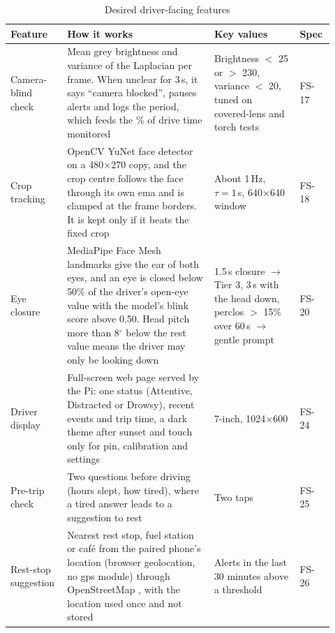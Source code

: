 \begin{table}[htbp]
\centering
\caption{Desired driver-facing features}
\label{tab:ch4-desired}
\footnotesize
\setlength{\tabcolsep}{3pt}
\renewcommand{\arraystretch}{1.15}
\begin{tabular}{|p{0.150\linewidth}|p{0.430\linewidth}|p{0.250\linewidth}|p{0.090\linewidth}|}
\hline
\textbf{Feature} & \textbf{How it works} & \textbf{Key values} & \textbf{Spec} \\
\hline
Camera-blind check & Mean grey brightness and variance of the Laplacian \cite{r74} per frame. When unclear for 3\,s, it says ``camera blocked'', pauses alerts and logs the period, which feeds the \% of drive time monitored & Brightness $<$ 25 or $>$ 230, variance $<$ 20, tuned on covered-lens and torch tests & FS-17 \\
\hline
Crop tracking & OpenCV YuNet face detector on a 480$\times$270 copy, and the crop centre follows the face through its own \gls{ema} and is clamped at the frame borders. It is kept only if it beats the fixed crop & About 1\,Hz, $\tau = 1$\,s, 640$\times$640 window & FS-18 \\
\hline
Eye closure & MediaPipe Face Mesh \cite{r49} landmarks give the \gls{ear} of both eyes, and an eye is closed below 50\% of the driver's open-eye value with the model's blink score above 0.50. Head pitch more than 8$^\circ$ below the rest value means the driver may only be looking down & 1.5\,s closure $\rightarrow$ Tier 3, 3\,s with the head down, \gls{perclos} $>$ 15\% over 60\,s $\rightarrow$ gentle prompt & FS-20 \\
\hline
Driver display & Full-screen web page served by the Pi: one status (Attentive, Distracted or Drowsy), recent events and trip time, a dark theme after sunset and touch only for \gls{pin}, calibration and settings & 7-inch, 1024$\times$600 & FS-24 \\
\hline
Pre-trip check & Two questions before driving (hours slept, how tired), where a tired answer leads to a suggestion to rest & Two taps & FS-25 \\
\hline
Rest-stop suggestion & Nearest rest stop, fuel station or caf\'e from the paired phone's location (browser geolocation, no \gls{gps} module) through OpenStreetMap \cite{r68}, with the location used once and not stored & Alerts in the last 30 minutes above a threshold & FS-26 \\
\hline
\end{tabular}
\end{table}

